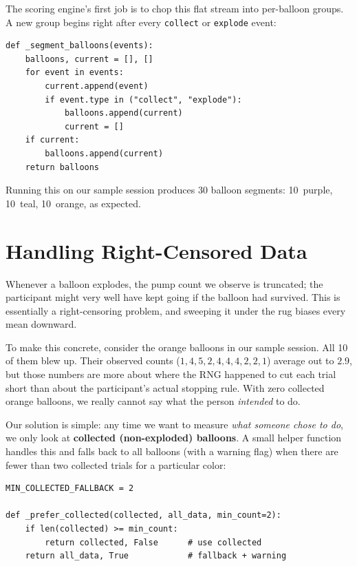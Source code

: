 \documentclass[11pt,a4paper]{article}
\begin{document}
The scoring engine's first job is to chop this flat stream into per-balloon groups.
A new group begins right after every \texttt{collect} or \texttt{explode} event:

\begin{lstlisting}[style=pythonstyle,caption={Balloon segmentation (Python).}]
def _segment_balloons(events):
    balloons, current = [], []
    for event in events:
        current.append(event)
        if event.type in ("collect", "explode"):
            balloons.append(current)
            current = []
    if current:
        balloons.append(current)
    return balloons
\end{lstlisting}

Running this on our sample session produces 30 balloon segments:
10~purple, 10~teal, 10~orange, as expected.


\section{Handling Right-Censored Data}

Whenever a balloon explodes, the pump count we observe is truncated; the
participant might very well have kept going if the balloon had survived.
This is essentially a right-censoring problem, and sweeping it under the rug
biases every mean downward.

To make this concrete, consider the orange balloons in our sample session. All 10
of them blew up. Their observed counts ($1, 4, 5, 2, 4, 4, 4, 2, 2, 1$)
average out to $2.9$, but those numbers are more about where the RNG happened to
cut each trial short than about the participant's actual stopping rule. With zero
collected orange balloons, we really cannot say what the person \emph{intended}
to do.

Our solution is simple: any time we want to measure \emph{what someone chose to do},
we only look at \textbf{collected (non-exploded) balloons}. A small helper function
handles this and falls back to all balloons (with a warning flag) when there are
fewer than two collected trials for a particular color:

\begin{lstlisting}[style=pythonstyle,caption={Collected-preference helper (Python).}]
MIN_COLLECTED_FALLBACK = 2

def _prefer_collected(collected, all_data, min_count=2):
    if len(collected) >= min_count:
        return collected, False      # use collected
    return all_data, True            # fallback + warning
\end{lstlisting}
\end{document}
